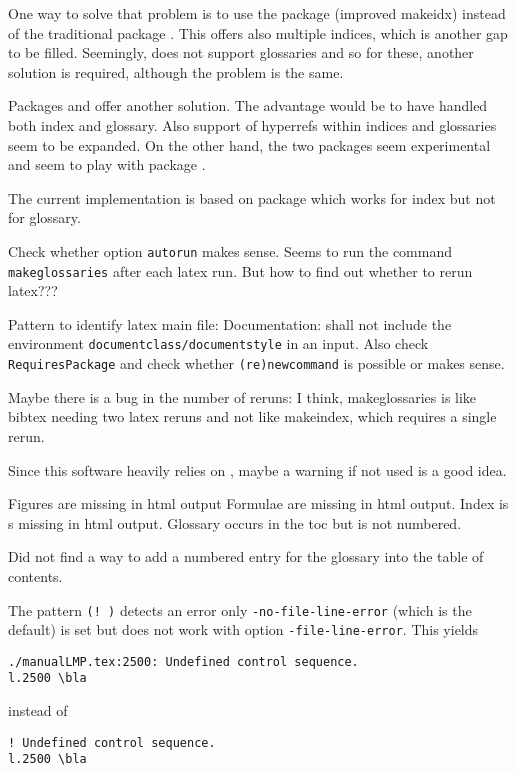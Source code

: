 \documentclass[a4paper,12pt]{book}
\begin{document}
One way to solve that problem is to use the package  
(improved makeidx) instead of the traditional package . 
This offers also multiple indices, which is another gap to be filled. 
Seemingly,  does not support glossaries 
and so for these, another solution is required, 
although the problem is the same. 

Packages  and  
offer another solution. 
The advantage would be to have handled both index and glossary. 
Also support of hyperrefs within indices and glossaries seem to be expanded. 
On the other hand, the two packages seem experimental 
and seem to play with package . 

The current implementation is based on package  
which works for index but not for glossary. 

Check whether  option \texttt{autorun} makes sense. 
Seems to run the command \texttt{makeglossaries} after each latex run. 
But how to find out whether to rerun latex??? 

Pattern to identify latex main file: 
Documentation: shall not include the environment 
\texttt{documentclass/documentstyle} in an input. 
Also check \texttt{RequiresPackage} 
and check whether \texttt{(re)newcommand} is possible %
or makes sense. 

Maybe there is a bug in the number of reruns: 
I think, makeglossaries is like bibtex needing two latex reruns 
and not like makeindex, which requires a single rerun. 

Since this software heavily relies on , 
maybe a warning if not used is a good idea. 

Figures are missing in html output 
Formulae are missing in html output. 
Index is s missing in html output. 
Glossary occurs in the toc but is not numbered. 

Did not find a way to add a numbered entry for the glossary 
into the table of contents. 

The pattern \texttt{(!\ )} detects an error only %
\texttt{-no-file-line-error} (which is the default) is set 
but does not work with option \texttt{-file-line-error}. 
This yields 
%
\begin{verbatim}
./manualLMP.tex:2500: Undefined control sequence.
l.2500 \bla
\end{verbatim}
%
instead of 
%
\begin{verbatim}
! Undefined control sequence.
l.2500 \bla
\end{verbatim}
\end{document}
